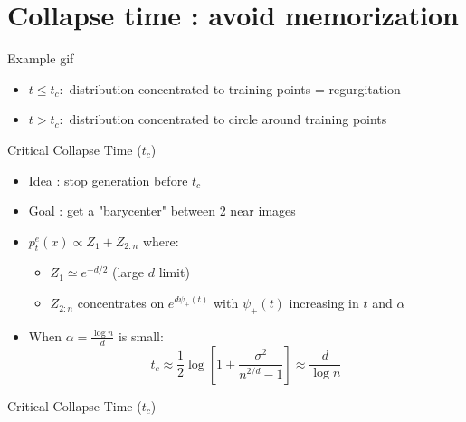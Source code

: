 \documentclass[aspectratio=169]{beamer}
\begin{document}
\section{Collapse time : avoid memorization}

\begin{frame}{Example gif}
    \begin{itemize}
    \end{itemize}
    \begin{center}
    \end{center}
    \begin{itemize}
        \item $t \leq t_c :$ distribution concentrated to training points = regurgitation
        \item $t > t_c :$ distribution concentrated to circle around training points
    \end{itemize}
\end{frame}


\begin{frame}{Critical Collapse Time ($t_c$)}
    \begin{itemize}
        \item Idea : stop generation before $t_c$
        \item Goal : get a "barycenter" between 2 near images
        \item $p_t^e(x) \propto Z_1 + Z_{2:n}$ where:
        \begin{itemize}
            \item $Z_1 \simeq e^{-d/2}$ (large $d$ limit)
            \item $Z_{2:n}$ concentrates on $e^{d\psi_+(t)}$ with $\psi_+(t)$ increasing in $t$ and $\alpha$
        \end{itemize}
        \item When $\alpha = \frac{\log n}{d}$ is small:
        \begin{equation}
            t_c \approx \frac{1}{2}\log\left[1+\frac{\sigma^2}{n^{2/d}-1}\right] \approx \frac{d}{\log n}
        \end{equation}
    \end{itemize}
\end{frame}

\begin{frame}{Critical Collapse Time ($t_c$)}
    \begin{center}
    \end{center}
\end{frame}
\end{document}
